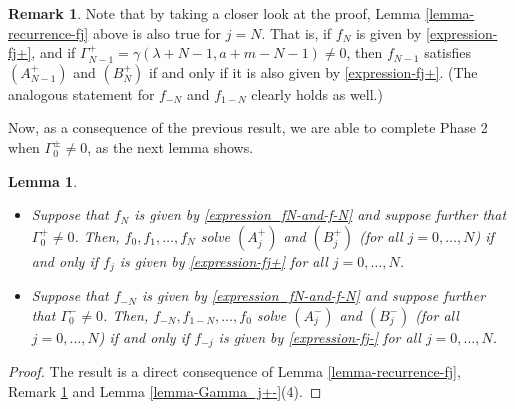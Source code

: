 \documentclass[12pt, pdflatex, a4paper]{article}
\theoremstyle{plain}
\newtheorem{lemma}[thm]{Lemma}
\theoremstyle{definition}
\newtheorem{rem}[thm]{Remark}
\begin{document}
\begin{rem}\label{rem-lemma-recurrence-forj=N}
Note that by taking a closer look at the proof, Lemma \ref{lemma-recurrence-fj} above is also true for $j= N$. That is, if $f_N$ is given by \eqref{expression-fj+}, and if $\Gamma_{N-1}^+ = \gamma(\lambda+N-1, a+m-N-1) \neq 0$, then $f_{N-1}$ satisfies $(A_{N-1}^+)$ and $(B_N^+)$ if and only if it is also given by \eqref{expression-fj+}. (The analogous statement for $f_{-N}$ and $f_{1-N}$ clearly holds as well.)
\end{rem}


Now, as a consequence of the previous result, we are able to complete Phase 2 when $\Gamma_0^\pm \neq 0$, as the next lemma shows.

\begin{lemma}\label{lemma-expressions-fj}
\begin{itemize}
\item[\normalfont{(1)}] Suppose that $f_{N}$ is given by \eqref{expression_fN-and-f-N} and suppose further that $\Gamma_0^+ \neq 0$. Then,
$f_0, f_1, \ldots, f_{N}$ solve $(A_j^+)$ and $(B_{j}^+)$ (for all $j = 0, \ldots, N$) if and only if $f_j$ is given by \eqref{expression-fj+} for all $j = 0, \ldots, N$.
\item[\normalfont{(2)}] Suppose that $f_{-N}$ is given by \eqref{expression_fN-and-f-N} and suppose further that $\Gamma_0^- \neq 0$. Then,  $f_{-N}, f_{1-N}, \ldots, f_0$ solve $(A_j^-)$ and $(B_{j}^-)$ (for all $j = 0, \ldots, N$) if and only if $f_{-j}$ is given by \eqref{expression-fj-} for all $j = 0, \ldots, N$.
\end{itemize}
\end{lemma}

\begin{proof}
The result is a direct consequence of Lemma \ref{lemma-recurrence-fj}, Remark \ref{rem-lemma-recurrence-forj=N} and Lemma \ref{lemma-Gamma_j+-}(4).
\end{proof}
\end{document}
